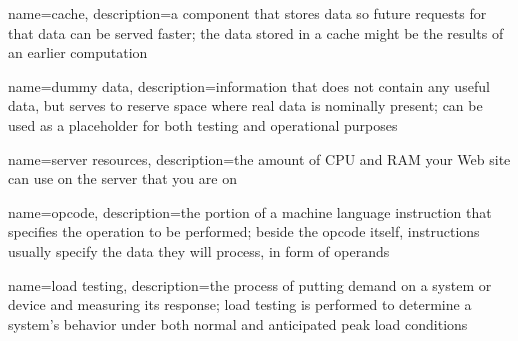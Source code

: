 {
	name={cache},
	description={a component that stores data so future requests for that data can be served faster; the data stored in a cache might be the results of an earlier computation \cite{Wiki:Cache}}
}

{
	name={dummy data},
	description={information that does not contain any useful data, but serves to reserve space where real data is nominally present; can be used as a placeholder for both testing and operational purposes \cite{Wiki:Dummy-data}}
}

{
	name={server resources},
	description={the amount of CPU and RAM your Web site can use on the server that you are on \cite{WebHostingShow:Server-resources}}
}

{
	name={opcode},
	description={the portion of a machine language instruction that specifies the operation to be performed; beside the opcode itself, instructions usually specify the data they will process, in form of operands \cite{Wiki:Opcode}}
}


{
	name={load testing},
	description={the process of putting demand on a system or device and measuring its response; load testing is performed to determine a system’s behavior under both normal and anticipated peak load conditions \cite{Wiki:Load-testing}}
}
